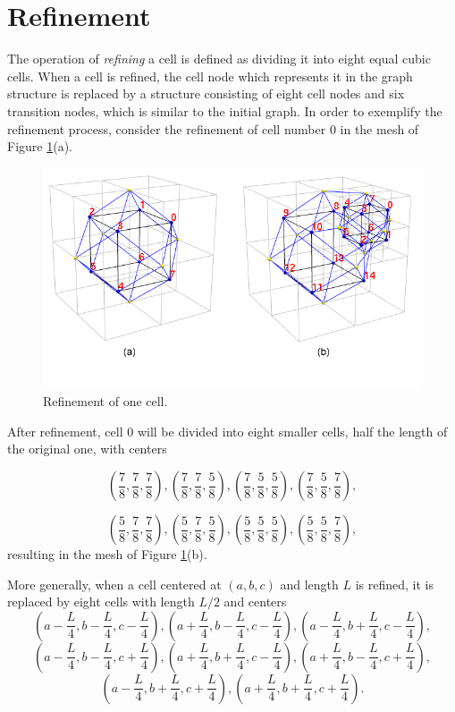 \section{Refinement}  \label{SEC_REFINEMENT}
The operation of \textit{refining} a cell is defined as dividing it
into eight equal cubic cells. When a cell is refined, the cell node
which represents it in the graph structure is replaced by a
structure consisting of eight cell nodes and six transition nodes,
which is similar to the initial graph. In order to exemplify the
refinement process, consider the refinement of cell number $0$ in
the mesh of Figure \ref{FIG_MESH_REFINEMENT}(a).

\begin{figure}[!ht]
    \centering
    \includegraphics[scale=0.45,angle=0]{../img/gridAndGraph.jpg}
    \caption{Refinement of one cell.}
    \label{FIG_MESH_REFINEMENT}
\end{figure}

\noindent After refinement, cell $0$ will be divided into eight
smaller cells, half the length of the original one, with centers

\[
  \left(\frac{7}{8},\frac{7}{8},\frac{7}{8}\right),
  \left(\frac{7}{8},\frac{7}{8},\frac{5}{8}\right),
  \left(\frac{7}{8},\frac{5}{8},\frac{5}{8}\right),
  \left(\frac{7}{8},\frac{5}{8},\frac{7}{8}\right),
\]

\[
  \left(\frac{5}{8},\frac{7}{8},\frac{7}{8}\right),
  \left(\frac{5}{8},\frac{7}{8},\frac{5}{8}\right),
  \left(\frac{5}{8},\frac{5}{8},\frac{5}{8}\right),
  \left(\frac{5}{8},\frac{5}{8},\frac{7}{8}\right),
\]
resulting in the mesh of Figure \ref{FIG_MESH_REFINEMENT}(b).

More generally, when a cell centered at $(a, b, c)$ and length $L$
is refined, it is replaced by eight cells with length $L/2$ and
centers
\[
\left(a-\frac{L}{4},b-\frac{L}{4},c-\frac{L}{4}\right),
\left(a+\frac{L}{4},b-\frac{L}{4},c-\frac{L}{4}\right),
\left(a-\frac{L}{4},b+\frac{L}{4},c-\frac{L}{4}\right),
\]
\[
\left(a-\frac{L}{4},b-\frac{L}{4},c+\frac{L}{4}\right),
\left(a+\frac{L}{4},b+\frac{L}{4},c-\frac{L}{4}\right),
\left(a+\frac{L}{4},b-\frac{L}{4},c+\frac{L}{4}\right),
\]
\[
\left(a-\frac{L}{4},b+\frac{L}{4},c+\frac{L}{4}\right),
\left(a+\frac{L}{4},b+\frac{L}{4},c+\frac{L}{4}\right).
\]

